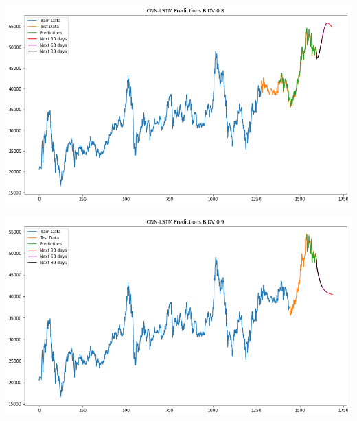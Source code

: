 \documentclass[conference]{IEEEtran}
\begin{document}
\begin{minipage}{0.23\textwidth}
    \centering
    \includegraphics[width=\linewidth]{images/CNN-LSTM/CNNLSTM_BIDV_82.png}
    \label{fig:image1}
\end{minipage}
\hfill
\begin{minipage}{0.23\textwidth}
    \centering
    \includegraphics[width=\linewidth]{images/CNN-LSTM/CNNLSTM_BIDV_91.png}
    \label{fig:image2}
\end{minipage}
\end{document}
